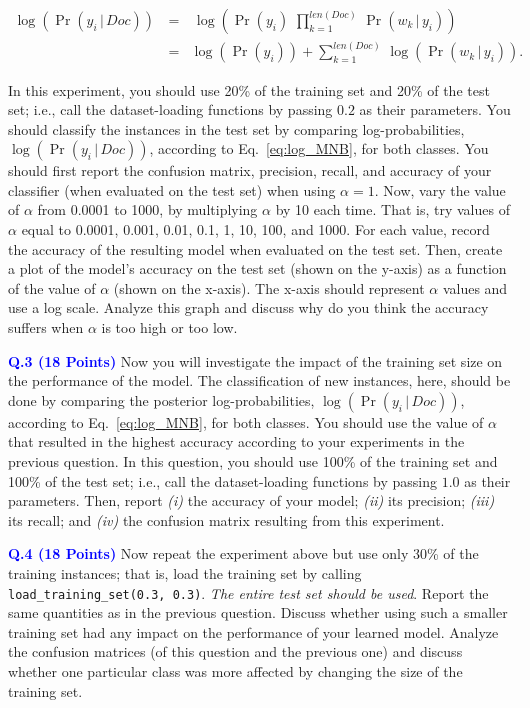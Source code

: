 \documentclass[letterpaper]{article}
\newcommand{\HIGHLIGHT}[1]{\textcolor{blue}{\textbf{#1}}}
\begin{document}
\begin{eqnarray}
    \log(\Pr(y_i \, | \, Doc)) \, &=& \, \log\left(\Pr(y_i) \,\, \prod_{k=1}^{len(Doc)} \, \Pr(w_k \, | \, y_i)\right) \\
    &=& \log(\Pr(y_i)) +\sum_{k=1}^{len(Doc)} \, \log(\Pr(w_k \, | \, y_i))  \label{eq:log_MNB}.
\end{eqnarray}

In this experiment, you should use 20\% of the training set and 20\% of the test set; i.e., call the dataset-loading functions by passing $0.2$ as their parameters. You should classify the instances in the test set by comparing log-probabilities, $\log(\Pr(y_i \, | \, Doc))$, according to Eq.~\eqref{eq:log_MNB}, for both classes. You should first report the confusion matrix, precision, recall, and accuracy of your classifier (when evaluated on the test set) when using $\alpha = 1$. Now, vary the value of $\alpha$ from 0.0001 to 1000, by multiplying $\alpha$ by 10 each time. That is, try values of $\alpha$ equal to 0.0001, 0.001, 0.01, 0.1, 1, 10, 100, and 1000. For each value, record the accuracy of the resulting model when evaluated on the test set. Then, create a plot of the model's accuracy on the test set (shown on the y-axis) as a function of the value of $\alpha$ (shown on the x-axis). The x-axis should represent $\alpha$ values and use a log scale. Analyze this graph and discuss why do you think the accuracy suffers when $\alpha$ is too high or too low.
%
%




\noindent \HIGHLIGHT{Q.3 (18 Points)} Now you will investigate the impact of the training set size on the performance of the model. The classification of new instances, here, should be done by comparing the posterior log-probabilities, $\log(\Pr(y_i \, | \, Doc))$, according to Eq.~\eqref{eq:log_MNB}, for both classes. You should use the value of $\alpha$ that resulted in the highest accuracy according to your experiments in the previous question. In this question, you should use 100\% of the training set and 100\% of the test set; i.e., call the dataset-loading functions by passing $1.0$ as their parameters. Then, report \textit{(i)} the accuracy of your model; \textit{(ii)} its precision; \textit{(iii)} its recall; and \textit{(iv)} the confusion matrix resulting from this experiment.
%
%



\noindent \HIGHLIGHT{Q.4 (18 Points)} Now repeat the experiment above but use only 30\% of the training instances; that is, load the training set by calling \texttt{load\_training\_set(0.3, 0.3)}. \textit{The entire test set should be used}. Report the same quantities as in the previous question. Discuss whether using such a smaller training set had any impact on the performance of your learned model. Analyze the confusion matrices (of this question and the previous one) and discuss whether one particular class was more affected by changing the size of the training set. 
%
%
\end{document}
